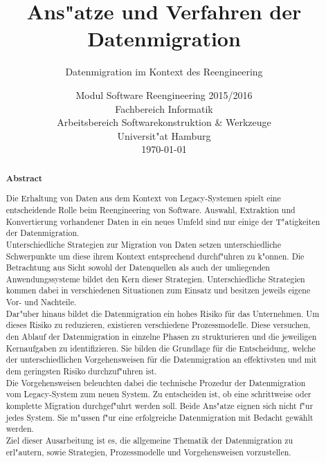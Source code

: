 \documentclass[11pt]{scrartcl}
\begin{document}
	
\title{Ans"atze und Verfahren der Datenmigration}

\subtitle{Datenmigration im Kontext des Reengineering} 


\date{Modul Software Reengineering 2015/2016\\
  \small Fachbereich Informatik\\ 
  Arbeitsbereich Softwarekonstruktion \& Werkzeuge\\ 
  Universit"at Hamburg\\[4mm]
  \today}

\maketitle

\begin{abstract}
	\small\noindent\textbf{Abstract}

	\noindent Die Erhaltung von Daten aus dem Kontext von Legacy-Systemen spielt eine entscheidende Rolle beim Reengineering von Software. Auswahl, Extraktion und Konvertierung vorhandener Daten in ein neues Umfeld sind nur einige der T"atigkeiten der Datenmigration. \\
	Unterschiedliche Strategien zur Migration von Daten setzen unterschiedliche Schwerpunkte um diese ihrem Kontext entsprechend durchf"uhren zu k"onnen. Die Betrachtung aus Sicht sowohl der Datenquellen als auch der umliegenden Anwendungssysteme bildet den Kern dieser Strategien. Unterschiedliche Strategien kommen dabei in verschiedenen Situationen zum Einsatz und besitzen jeweils eigene Vor- und Nachteile. \\
	Dar"uber hinaus bildet die Datenmigration ein hohes Risiko für das Unternehmen. Um dieses Risiko zu reduzieren, existieren verschiedene Prozessmodelle. Diese versuchen, den Ablauf der Datenmigration in einzelne Phasen zu strukturieren und die jeweiligen Kernaufgaben zu identifizieren. Sie bilden die Grundlage für die Entscheidung, welche der unterschiedlichen Vorgehensweisen für die Datenmigration an effektivsten und mit dem geringsten Risiko durchzuf"uhren ist. \\
	Die Vorgehensweisen beleuchten dabei die technische Prozedur der Datenmigration vom Legacy-System zum neuen System. Zu entscheiden ist, ob eine schrittweise oder komplette Migration durchgef"uhrt werden soll. Beide Ans"atze eignen sich nicht f"ur jedes System. Sie m"ussen f"ur eine erfolgreiche Datenmigration mit Bedacht gewählt werden.\\
	Ziel dieser Ausarbeitung ist es, die allgemeine Thematik der Datenmigration zu erl"autern, sowie Strategien, Prozessmodelle und Vorgehensweisen vorzustellen.
\end{abstract}
\end{document}
